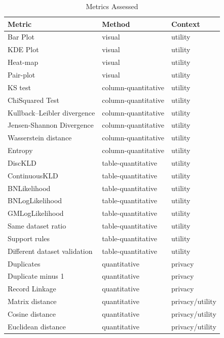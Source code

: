 \begin{table}[htpb]
    \caption{Metrics Assessed}
    \label{tab:variables}
    \centering
\begin{tabular}{@{}lll@{}}   \toprule
Metric                       & Method       & Context         \\\midrule
Bar Plot                     & visual       & utility         \\ 
KDE Plot                     & visual       & utility         \\ 
Heat-map                     & visual       & utility         \\ 
Pair-plot                    & visual       & utility         \\ 
KS test                      & column-quantitative & utility         \\ 
ChiSquared Test              & column-quantitative & utility         \\ 
Kullback–Leibler divergence  & column-quantitative & utility         \\ 
Jensen-Shannon Divergence    & column-quantitative & utility         \\ 
Wasserstein distance         & column-quantitative & utility         \\ 
Entropy                      & column-quantitative & utility         \\ 
DiscKLD                      & table-quantitative & utility         \\ 
ContinuousKLD                & table-quantitative & utility         \\ 
BNLikelihood                 & table-quantitative & utility         \\ 
BNLogLikelihood              & table-quantitative & utility         \\ 
GMLogLikelihood              & table-quantitative & utility         \\ 
Same dataset ratio           & table-quantitative & utility         \\ 
Support rules                & table-quantitative & utility         \\ 
Different dataset validation & table-quantitative & utility         \\ 
Duplicates                   & quantitative & privacy         \\ 
Duplicate minus 1            & quantitative & privacy         \\ 
Record Linkage             & quantitative & privacy         \\ 
Matrix distance              & quantitative & privacy/utility  \\ 
Cosine distance              & quantitative & privacy/utility \\ 
Euclidean distance           & quantitative & privacy/utility \\ \bottomrule

\end{tabular}
\end{table}


